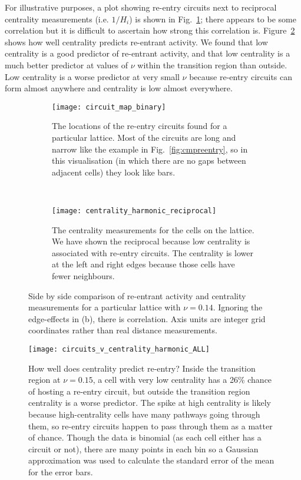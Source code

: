 For illustrative purposes, a plot showing re-entry circuits next to reciprocal centrality measurements (i.e. $1 / H_i$) is shown in Fig.~\ref{fig:centralitycomparison}; there appears to be some correlation but it is difficult to ascertain how strong this correlation is. Figure~\ref{fig:cvcall} shows how well centrality predicts re-entrant activity. We found that low centrality is a good predictor of re-entrant activity, and that low centrality is a much better predictor at values of $\nu$ within the transition region than outside. Low centrality is a worse predictor at very small $\nu$ because re-entry circuits can form almost anywhere and centrality is low almost everywhere.

\begin{figure}[h!] \begin{mdframed}
    \centering
    \begin{subfigure}[b]{0.46\textwidth}
        \texttt{[image: circuit\_map\_binary]}
        \caption{The locations of the re-entry circuits found for a particular lattice. Most of the circuits are long and narrow like the example in Fig.~\ref{fig:cmpreentry}, so in this visualisation (in which there are no gaps between adjacent cells) they look like bars.}
    \end{subfigure}
    ~
    \begin{subfigure}[b]{0.46\textwidth}
        \texttt{[image: centrality\_harmonic\_reciprocal]}
        \caption{The centrality measurements for the cells on the lattice. We have shown the reciprocal because low centrality is associated with re-entry circuits. The centrality is lower at the left and right edges because those cells have fewer neighbours.}
    \end{subfigure}
    \caption{Side by side comparison of re-entrant activity and centrality measurements for a particular lattice with $\nu = 0.14$. Ignoring the edge-effects in (b), there is correlation. Axis units are integer grid coordinates rather than real distance measurements.}
\label{fig:centralitycomparison}
\end{mdframed} \end{figure}

\begin{figure}
    \begin{mdframed}
    \centering
    \texttt{[image: circuits\_v\_centrality\_harmonic\_ALL]}
    \caption{How well does centrality predict re-entry? Inside the transition region at $\nu=0.15$, a cell with very low centrality has a 26\% chance of hosting a re-entry circuit, but outside the transition region centrality is a worse predictor. The spike at high centrality is likely because high-centrality cells have many pathways going through them, so re-entry circuits happen to pass through them as a matter of chance. Though the data is binomial (as each cell either has a circuit or not), there are many points in each bin so a Gaussian approximation was used to calculate the standard error of the mean for the error bars.}
    \label{fig:cvcall}
\end{mdframed} \end{figure}

